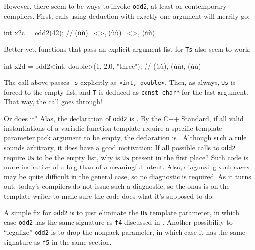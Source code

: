 \noindent However, there seem to be ways to invoke \lstinline!odd2!, at least on
contemporary compilers. First, calls using deduction with exactly one
argument will merrily go:

\begin{emcppslisting}[emcppsbatch=e22]
int x2c = odd2(42);  // (ù{}ù)=<>, (ù{}ù)=<>, (ù{}ù)
\end{emcppslisting}
    

\noindent Better yet, functions that pass an explicit argument list for
\lstinline!Ts! also seem to work:

\begin{emcppslisting}[emcppsbatch=e22]
int x2d = odd2<int, double>(1, 2.0, "three");
    // (ù{}ù), (ù{}ù), (ù{}ù)
\end{emcppslisting}
    

\noindent The call above passes \lstinline!Ts! explicitly as
\lstinline!<int,!~\lstinline!double>!. Then, as always, \lstinline!Us! is forced
to the empty list, and \lstinline!T! is deduced as
\lstinline!const!~\lstinline!char*! for the last argument. That way, the call
goes through!

Or does it? Alas, the declaration of \lstinline!odd2! is . By
the C++ Standard, if all valid instantiations of a variadic function
template require a specific template parameter pack argument to be
empty, the declaration is . Although such a rule sounds
arbitrary, it does have a good motivation: If all possible calls to
\lstinline!odd2! require \lstinline!Us! to be the empty list, why is
\lstinline!Us! present in the first place? Such code is more indicative of
a bug than of a meaningful intent. Also, diagnosing such cases may be
quite difficult in the general case, so no diagnostic is required. As it
turns out, today's compilers do not issue such a diagnostic, so the onus
is on the template writer to make sure the code does what it's supposed
to do.

A simple fix for \lstinline!odd2! is to just eliminate the \lstinline!Us!
template parameter, in which case \lstinline!odd2! has the same signature
as \lstinline!f4! discussed in . Another possibility to ``legalize'' \lstinline!odd2! is to
drop the nonpack parameter, in which case it has the same signature as
\lstinline!f5! in the same section.

